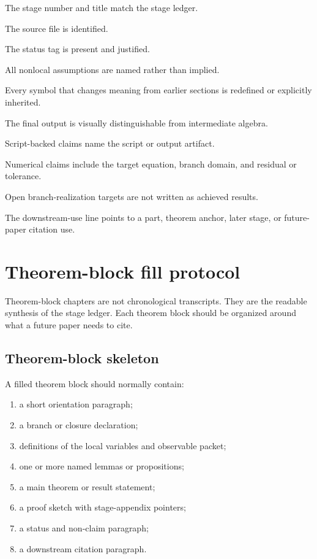 \begin{verificationchecklist}
\item The stage number and title match the stage ledger.
\item The source file is identified.
\item The status tag is present and justified.
\item All nonlocal assumptions are named rather than implied.
\item Every symbol that changes meaning from earlier sections is redefined or explicitly inherited.
\item The final output is visually distinguishable from intermediate algebra.
\item Script-backed claims name the script or output artifact.
\item Numerical claims include the target equation, branch domain, and residual or tolerance.
\item Open branch-realization targets are not written as achieved results.
\item The downstream-use line points to a part, theorem anchor, later stage, or future-paper citation use.
\end{verificationchecklist}

\section{Theorem-block fill protocol}
\label{sec:theorem-block-fill-protocol}

Theorem-block chapters are not chronological transcripts.  They are the readable synthesis of the stage ledger.  Each theorem block should be organized around what a future paper needs to cite.

\subsection{Theorem-block skeleton}
\label{subsec:theorem-block-skeleton}

A filled theorem block should normally contain:

\begin{enumerate}[leftmargin=2.0em]
\item a short orientation paragraph;
\item a branch or closure declaration;
\item definitions of the local variables and observable packet;
\item one or more named lemmas or propositions;
\item a main theorem or result statement;
\item a proof sketch with stage-appendix pointers;
\item a status and non-claim paragraph;
\item a downstream citation paragraph.
\end{enumerate}

